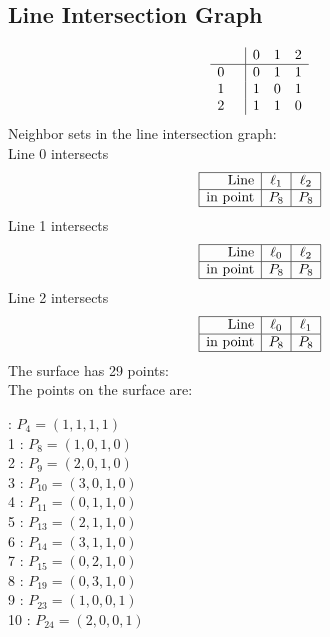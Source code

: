 \documentclass{article}
\begin{document}
{\subsection*{Line Intersection Graph}
{\arraycolsep=1pt
$$
\begin{array}{rr|*{3}r}
 &  & 0 & 1 & 2\\
\hline
0 &  & 0 & 1 & 1\\
1 &  & 1 & 0 & 1\\
2 &  & 1 & 1 & 0\\
\end{array}
$$
}%
Neighbor sets in the line intersection graph:\\
Line 0 intersects 
$$
\begin{array}{|r*{2}{|c}|}
\hline
\mbox{Line}  & \ell_{1} & \ell_{2}\\
\hline
\mbox{in point}  & P_{8} & P_{8}\\
\hline
\end{array}
$$
Line 1 intersects 
$$
\begin{array}{|r*{2}{|c}|}
\hline
\mbox{Line}  & \ell_{0} & \ell_{2}\\
\hline
\mbox{in point}  & P_{8} & P_{8}\\
\hline
\end{array}
$$
Line 2 intersects 
$$
\begin{array}{|r*{2}{|c}|}
\hline
\mbox{Line}  & \ell_{0} & \ell_{1}\\
\hline
\mbox{in point}  & P_{8} & P_{8}\\
\hline
\end{array}
$$
The surface has 29 points:\\
The points on the surface are:\\
\begin{multicols}{3}
 : $P_{4}=( 1, 1, 1, 1 )$\\
1 : $P_{8}=( 1, 0, 1, 0 )$\\
2 : $P_{9}=( 2, 0, 1, 0 )$\\
3 : $P_{10}=( 3, 0, 1, 0 )$\\
4 : $P_{11}=( 0, 1, 1, 0 )$\\
5 : $P_{13}=( 2, 1, 1, 0 )$\\
6 : $P_{14}=( 3, 1, 1, 0 )$\\
7 : $P_{15}=( 0, 2, 1, 0 )$\\
8 : $P_{19}=( 0, 3, 1, 0 )$\\
9 : $P_{23}=( 1, 0, 0, 1 )$\\
10 : $P_{24}=( 2, 0, 0, 1 )$\\

\end{multicols}}
\end{document}
